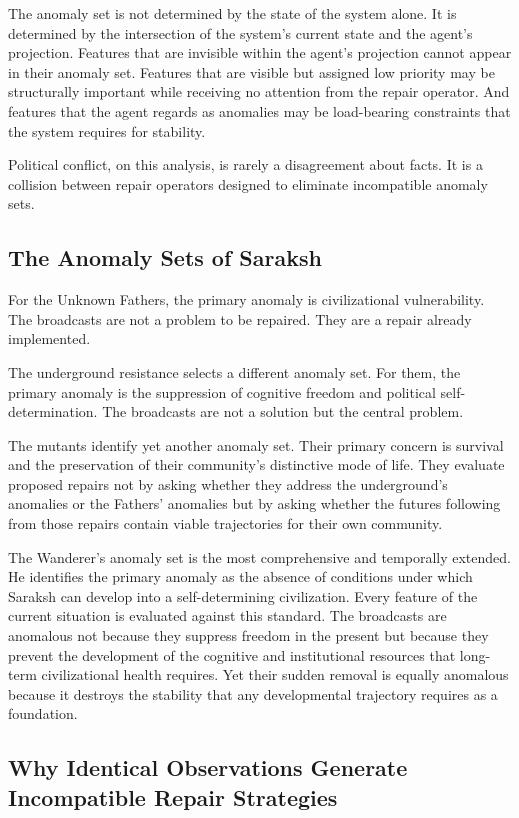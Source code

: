 \documentclass[12pt, a4paper]{article}
\theoremstyle{plain}
\theoremstyle{definition}
\theoremstyle{remark}
\begin{document}
The anomaly set is not determined by the state
of the system alone. It is determined by the
intersection of the system's current state and
the agent's projection. Features that are
invisible within the agent's projection cannot
appear in their anomaly set. Features that are
visible but assigned low priority may be
structurally important while receiving no
attention from the repair operator. And features
that the agent regards as anomalies may be
load-bearing constraints that the system requires
for stability.

Political conflict, on this analysis, is rarely
a disagreement about facts. It is a collision
between repair operators designed to eliminate
incompatible anomaly sets.

\subsection{The Anomaly Sets of Saraksh}

For the Unknown Fathers, the primary anomaly is
civilizational vulnerability. The broadcasts are
not a problem to be repaired. They are a repair
already implemented.

The underground resistance selects a different
anomaly set. For them, the primary anomaly is
the suppression of cognitive freedom and political
self-determination. The broadcasts are not a
solution but the central problem.

The mutants identify yet another anomaly set.
Their primary concern is survival and the
preservation of their community's distinctive
mode of life. They evaluate proposed repairs
not by asking whether they address the
underground's anomalies or the Fathers' anomalies
but by asking whether the futures following from
those repairs contain viable trajectories for
their own community.

The Wanderer's anomaly set is the most
comprehensive and temporally extended. He
identifies the primary anomaly as the absence
of conditions under which Saraksh can develop
into a self-determining civilization. Every
feature of the current situation is evaluated
against this standard. The broadcasts are
anomalous not because they suppress freedom
in the present but because they prevent the
development of the cognitive and institutional
resources that long-term civilizational health
requires. Yet their sudden removal is equally
anomalous because it destroys the stability
that any developmental trajectory requires
as a foundation.

\subsection{Why Identical Observations Generate
Incompatible Repair Strategies}
\end{document}
